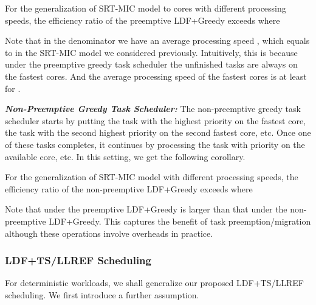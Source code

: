 \documentclass[prodmode,acmtompecs]{acmsmall}
\newcommand{\myComments}[1]{}
\newif\iftompecsonly
\newif\iftompecsextended
\newcommand{\tompecsonlyStart}{\iftompecsonly \myComments{TOMPECS only version: }}
\newcommand{\tompecsextendedStart}{\iftompecsextended  \myComments{TOMPECS extended version: }}
\newcommand{\commentEnd}{\myComments{End}}
\begin{document}
\begin{corollary}
\label{corollary_gamma1_diff_speed_pre}
For the generalization of SRT-MIC model to cores with different processing speeds, the efficiency ratio of the preemptive LDF+Greedy exceeds  where

\end{corollary}

Note that in the denominator we have an average processing speed , which equals to  in the SRT-MIC model we considered previously. 
Intuitively, this is because under the preemptive greedy task scheduler the unfinished tasks are always on the fastest cores. And the average processing speed of the  fastest cores is at least  for . 
\tompecsonlyStart
We omit the proof to save space. For a detailed proof, see the extended version of this paper \cite{EXT}. 
\commentEnd\fi
\tompecsextendedStart
Refer to Appendix \ref{appendix_pf_gamma1_diff_speed_pre} for the proof. 
\commentEnd\fi

{\bf \em Non-Preemptive Greedy Task Scheduler: }
The non-preemptive greedy task scheduler starts by putting the task with the highest priority on the fastest core, the task with the second highest priority on the second fastest core, etc. Once one of these tasks completes, it continues by processing the task with priority  on the available core, etc. In this setting, we get the following corollary. 

\begin{corollary}
\label{corollary_gamma1_diff_speed_nonpre}
For the generalization of SRT-MIC model with different processing speeds, the efficiency ratio of the non-preemptive LDF+Greedy exceeds  where

\end{corollary}
\tompecsonlyStart
\noindent See the extended version of this paper \cite{EXT} for the proof. 
\commentEnd\fi
\tompecsextendedStart
\noindent See Appendix \ref{appendix_pf_gamma1_diff_speed_nonpre} for the proof. 
\commentEnd\fi

Note that  under the preemptive LDF+Greedy is larger than that under the non-preemptive LDF+Greedy. This captures the benefit of task preemption/migration although these operations involve overheads in practice. 

\subsubsection{LDF+TS/LLREF Scheduling}
For deterministic workloads, we shall generalize our proposed LDF+TS/LLREF scheduling. We first introduce a further assumption. 
\end{document}
